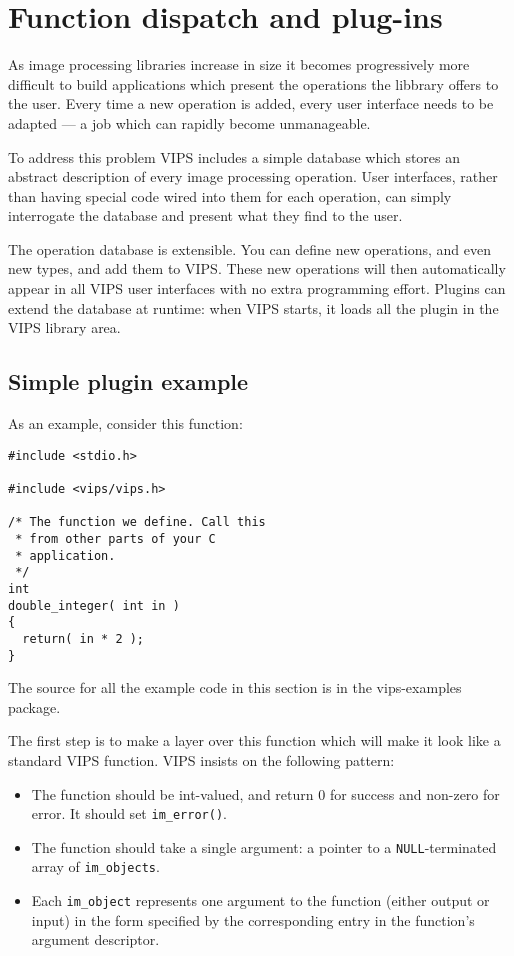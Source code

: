 \section{Function dispatch and plug-ins}

As image processing libraries increase in size it becomes progressively more
difficult to build applications which present the operations the libbrary
offers to the user. Every time a new operation is added, every user interface
needs to be adapted --- a job which can rapidly become unmanageable.

To address this problem VIPS includes a simple database which stores an
abstract description of every image processing operation. User interfaces,
rather than having special code wired into them for each operation, can
simply interrogate the database and present what they find to the user.

The operation database is extensible. You can define new operations, and even
new types, and add them to VIPS. These new operations will then automatically
appear in all VIPS user interfaces with no extra programming effort. Plugins
can extend the database at runtime: when VIPS starts, it loads all the plugin
in the VIPS library area.

\subsection{Simple plugin example}

As an example, consider this function:

\begin{verbatim}
#include <stdio.h>

#include <vips/vips.h>

/* The function we define. Call this 
 * from other parts of your C 
 * application. 
 */
int
double_integer( int in )
{
  return( in * 2 );
}
\end{verbatim}

\noindent
The source for all the example code in this section is in the vips-examples
package. 

The first step is to make a layer over this function which will make it
look like a standard VIPS function. VIPS insists on the following pattern:

\begin{itemize}

\item
The function should be int-valued, and return 0 for success and non-zero
for error. It should set \verb+im_error()+.

\item
The function should take a single argument: a pointer to a
\verb+NULL+-terminated array of \verb+im_objects+.

\item
Each \verb+im_object+ represents one argument to the function (either output
or input) in the form specified by the corresponding entry in the function's
argument descriptor.

\end{itemize}


